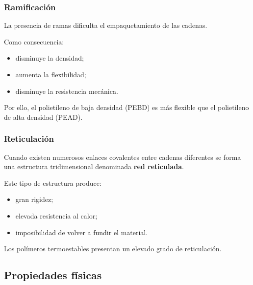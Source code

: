 
\subsubsection*{Ramificación}

La presencia de ramas dificulta el empaquetamiento de las cadenas.

Como consecuencia:

\begin{itemize}

\item disminuye la densidad;

\item aumenta la flexibilidad;

\item disminuye la resistencia mecánica.

\end{itemize}

Por ello, el polietileno de baja densidad (PEBD) es más flexible que el
polietileno de alta densidad (PEAD).


\subsubsection*{Reticulación}

Cuando existen numerosos enlaces covalentes entre cadenas diferentes se forma una
estructura tridimensional denominada \textbf{red reticulada}.

Este tipo de estructura produce:

\begin{itemize}

\item gran rigidez;

\item elevada resistencia al calor;

\item imposibilidad de volver a fundir el material.

\end{itemize}

Los polímeros termoestables presentan un elevado grado de reticulación.


\subsection{Propiedades físicas}

